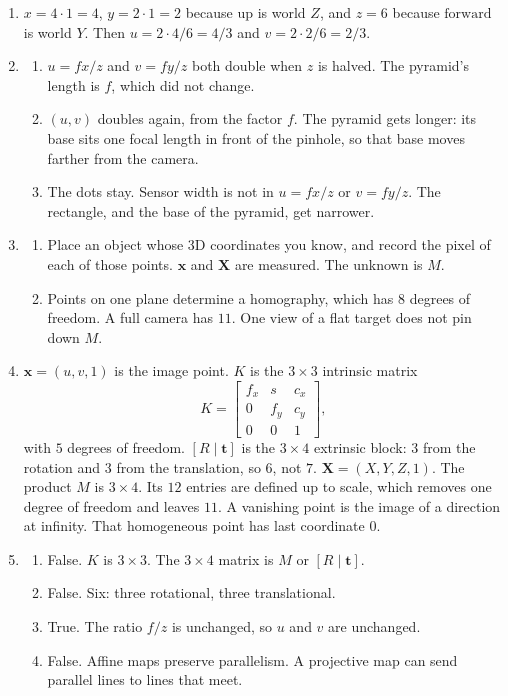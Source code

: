 \documentclass[11pt]{article}
\begin{document}
\begin{enumerate}
\item $x=4\cdot 1=4$, $y=2\cdot 1=2$ because $\mathrm{up}$ is world $Z$, and $z=6$ because $\mathrm{forward}$ is world $Y$. Then $u=2\cdot 4/6=4/3$ and $v=2\cdot 2/6=2/3$.

\item
\begin{enumerate}
\item $u=fx/z$ and $v=fy/z$ both double when $z$ is halved. The pyramid's length is $f$, which did not change.
\item $(u,v)$ doubles again, from the factor $f$. The pyramid gets longer: its base sits one focal length in front of the pinhole, so that base moves farther from the camera.
\item The dots stay. Sensor width is not in $u=fx/z$ or $v=fy/z$. The rectangle, and the base of the pyramid, get narrower.
\end{enumerate}

\item
\begin{enumerate}
\item Place an object whose 3D coordinates you know, and record the pixel of each of those points. $\mathbf{x}$ and $\mathbf{X}$ are measured. The unknown is $M$.
\item Points on one plane determine a homography, which has $8$ degrees of freedom. A full camera has $11$. One view of a flat target does not pin down $M$.
\end{enumerate}

\item $\mathbf{x}=(u,v,1)$ is the image point. $K$ is the $3\times 3$ intrinsic matrix
\[
K=\begin{bmatrix} f_x & s & c_x \\ 0 & f_y & c_y \\ 0 & 0 & 1 \end{bmatrix},
\]
with $5$ degrees of freedom. $[R\mid\mathbf{t}]$ is the $3\times 4$ extrinsic block: $3$ from the rotation and $3$ from the translation, so $6$, not $7$. $\mathbf{X}=(X,Y,Z,1)$. The product $M$ is $3\times 4$. Its $12$ entries are defined up to scale, which removes one degree of freedom and leaves $11$. A vanishing point is the image of a direction at infinity. That homogeneous point has last coordinate $0$.

\item
\begin{enumerate}
\item False. $K$ is $3\times 3$. The $3\times 4$ matrix is $M$ or $[R\mid\mathbf{t}]$.
\item False. Six: three rotational, three translational.
\item True. The ratio $f/z$ is unchanged, so $u$ and $v$ are unchanged.
\item False. Affine maps preserve parallelism. A projective map can send parallel lines to lines that meet.
\end{enumerate}


\end{enumerate}
\end{document}

